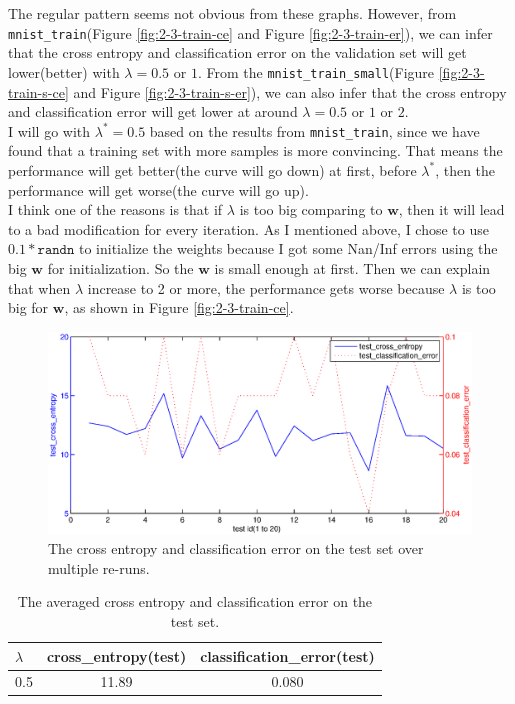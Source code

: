 \documentclass{article}
\begin{document}
The regular pattern seems not obvious from these graphs. However, from \texttt{mnist\_train}(Figure \ref{fig:2-3-train-ce} and Figure \ref{fig:2-3-train-er}), we can infer that the cross entropy and classification error on the validation set will get lower(better) with $\lambda=0.5$ or $1$. From the \texttt{mnist\_train\_small}(Figure \ref{fig:2-3-train-s-ce} and Figure \ref{fig:2-3-train-s-er}), we can also infer that the cross entropy and classification error will get lower at around $\lambda=0.5$ or $1$ or $2$.\\

I will go with $\lambda^{*}=0.5$ based on the results from \texttt{mnist\_train}, since we have found that a training set with more samples is more convincing. That means the performance will get better(the curve will go down) at first, before $\lambda^{*}$, then the performance will get worse(the curve will go up).\\

I think one of the reasons is that if $\lambda$ is too big comparing to $\mathbf{w}$, then it will lead to a bad modification for every iteration. As I mentioned above, I chose to use $0.1 * \texttt{randn}$ to initialize the weights because I got some Nan/Inf errors using the big $\mathbf{w}$ for initialization. So the $\mathbf{w}$ is small enough at first. Then we can explain that when $\lambda$ increase to 2 or more, the performance gets worse because $\lambda$ is too big for $\mathbf{w}$, as shown in Figure \ref{fig:2-3-train-ce}.\\

\begin{figure}[htb]
\centering
\includegraphics[width=\textwidth]{2-3-test.eps}
\caption{The cross entropy and classification error on the test set over multiple re-runs.
\label{fig:2-3-test}}
\end{figure}

\begin{table}[htbp]
\centering
\begin{tabular}{lcc}
\toprule
$\lambda$ & cross\_entropy(test) & classification\_error(test) \\
\midrule
0.5 & 11.89 & 0.080\\
\bottomrule
\end{tabular}
\caption{The averaged cross entropy and classification error on the test set. 
\label{table:test-final}}
\end{table}
\end{document}
